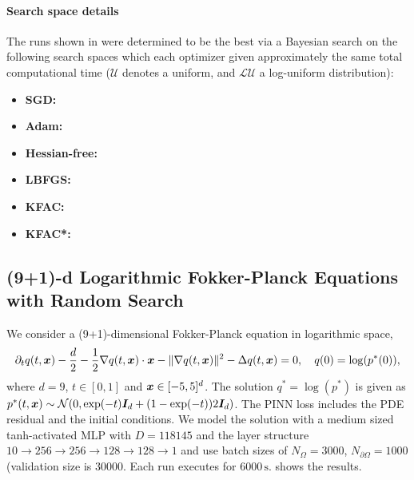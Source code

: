 \paragraph{Search space details} The runs shown in  were determined to be the best via a Bayesian search on the following search spaces which each optimizer given approximately the same total computational time ($\mathcal{U}$ denotes a uniform, and $\mathcal{LU}$ a log-uniform distribution):
\begin{itemize}
  \def\pathToRuns{kfac_pinns_exp/exp31_heat4d_mlp_tanh_256_bayes/tex/}
\item \textbf{SGD:} 
\item \textbf{Adam:} 
\item \textbf{Hessian-free:} 
\item \textbf{LBFGS:} 
\item \textbf{KFAC:} 
\item \textbf{KFAC*:} 
\end{itemize}

\subsection{(9+1)-d Logarithmic Fokker-Planck Equations with Random Search}\label{sec:fokker10d-appendix}
We consider a (9+1)-dimensional Fokker-Planck equation in logarithmic space,
\begin{equation*}
  \partial_t q(t, {\bm{x}})
  -
  \frac{d}{2}
  -
  \frac12 \nabla q(t, {\bm{x}})\cdot {\bm{x}}
  -
  \| \nabla q(t, {\bm{x}}) \|^2
  -
  \Delta q(t, {\bm{x}})
  =
  0,
  \quad
  q(0) = \log (p^*(0)),
\end{equation*}
where $d=9$, $t\in[0, 1]$ and ${\bm{x}}\in[-5, 5]^d$.
The solution $q^*=\log(p^*)$ is given as $p^*(t, {\bm{x}}) \sim \mathcal N (0, \exp(-t){\bm{I}}_d + (1-\exp(-t))2{\bm{I}}_d)$.
The PINN loss includes the PDE residual and the initial conditions.
We model the solution with a medium sized tanh-activated MLP with $D=\num{118145}$ and the layer structure $10 \to 256 \to 256 \to 128 \to 128 \to 1$ and use batch sizes of $N_{\Omega} = \num{3000}$, $N_{\partial\Omega} = \num{1000}$ (validation size is $\num{30000}$.
Each run executes for $\num{6000}\,\text{s}$.
 shows the results.

